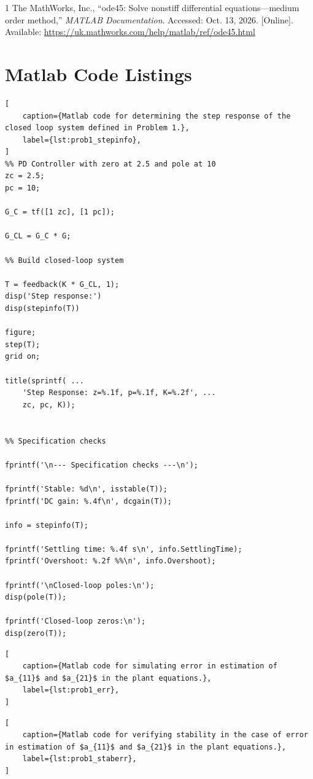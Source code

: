 \documentclass[conference,onecolumn,a4paper,11pt]{IEEEtran}
\begin{document}
\FloatBarrier
\begin{thebibliography}{1}
    The MathWorks, Inc., ``ode45: Solve nonstiff differential equations---medium order method,''
    \textit{MATLAB Documentation}. Accessed: Oct. 13, 2026. [Online]. Available:
    \url{https://uk.mathworks.com/help/matlab/ref/ode45.html}
\end{thebibliography}


\clearpage
\appendices
\section{Matlab Code Listings}

\begin{lstlisting}[
    caption={Matlab code for determining the step response of the closed loop system defined in Problem 1.},
    label={lst:prob1_stepinfo},
]
%% PD Controller with zero at 2.5 and pole at 10
zc = 2.5;
pc = 10;

G_C = tf([1 zc], [1 pc]);

G_CL = G_C * G;

%% Build closed-loop system

T = feedback(K * G_CL, 1);
disp('Step response:')
disp(stepinfo(T))

figure;
step(T);
grid on;

title(sprintf( ...
    'Step Response: z=%.1f, p=%.1f, K=%.2f', ...
    zc, pc, K));


%% Specification checks

fprintf('\n--- Specification checks ---\n');

fprintf('Stable: %d\n', isstable(T));
fprintf('DC gain: %.4f\n', dcgain(T));

info = stepinfo(T);

fprintf('Settling time: %.4f s\n', info.SettlingTime);
fprintf('Overshoot: %.2f %%\n', info.Overshoot);

fprintf('\nClosed-loop poles:\n');
disp(pole(T));

fprintf('Closed-loop zeros:\n');
disp(zero(T));
\end{lstlisting}

\begin{lstlisting}[
    caption={Matlab code for simulating error in estimation of $a_{11}$ and $a_{21}$ in the plant equations.},
    label={lst:prob1_err},
]
\end{lstlisting}

\begin{lstlisting}[
    caption={Matlab code for verifying stability in the case of error in estimation of $a_{11}$ and $a_{21}$ in the plant equations.},
    label={lst:prob1_staberr},
]
\end{lstlisting}
\end{document}
